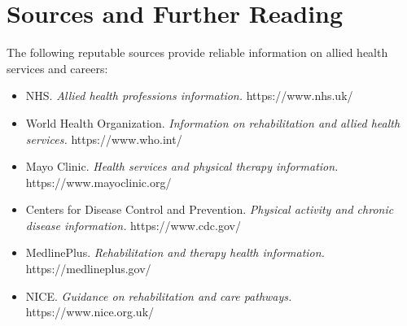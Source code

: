 \section*{Sources and Further Reading}
The following reputable sources provide reliable information on allied health services and careers:

\begin{itemize}
    \item NHS. \textit{Allied health professions information.} https://www.nhs.uk/
    \item World Health Organization. \textit{Information on rehabilitation and allied health services.} https://www.who.int/
    \item Mayo Clinic. \textit{Health services and physical therapy information.} https://www.mayoclinic.org/
    \item Centers for Disease Control and Prevention. \textit{Physical activity and chronic disease information.} https://www.cdc.gov/
    \item MedlinePlus. \textit{Rehabilitation and therapy health information.} https://medlineplus.gov/
    \item NICE. \textit{Guidance on rehabilitation and care pathways.} https://www.nice.org.uk/
\end{itemize}
